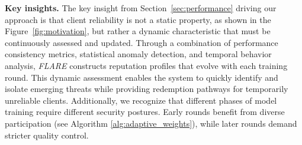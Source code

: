 \documentclass[lettersize,journal]{IEEEtran}
\begin{document}
\textbf{Key insights.} The key insight from Section~\ref{sec:performance} driving our approach is that client reliability is not a static property, as shown in the Figure~\ref{fig:motivation}, but rather a dynamic characteristic that must be continuously assessed and updated. Through a combination of performance consistency metrics, statistical anomaly detection, and temporal behavior analysis, \textit{FLARE} constructs reputation profiles that evolve with each training round. This dynamic assessment enables the system to quickly identify and isolate emerging threats while providing redemption pathways for temporarily unreliable clients. Additionally, we recognize that different phases of model training require different security postures. Early rounds benefit from diverse participation (see Algorithm \ref{alg:adaptive_weights}), while later rounds demand stricter quality control.
\end{document}
